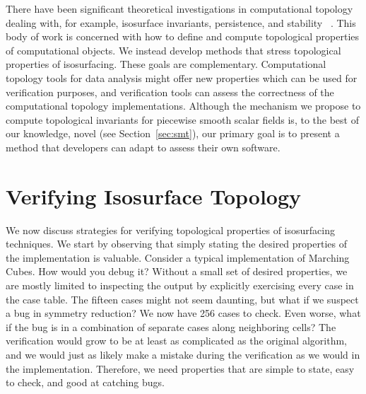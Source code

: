 There have been significant theoretical investigations in computational
topology dealing with, for example, isosurface invariants, persistence, and stability~
\cite{Cohen-Steiner07, edelsbrunner10}.
%
This body of work is concerned with how to
define and compute topological properties of computational objects. 
%
We instead develop methods that stress topological properties of isosurfacing.
%
These goals are complementary.
%
Computational topology 
tools for data analysis might offer new properties which can be used
for verification purposes, and verification tools can
assess the correctness of the computational topology implementations.
%
Although the mechanism we propose to compute topological invariants
for piecewise smooth scalar fields is, to the best of our knowledge,
novel (see Section~\ref{sec:smt}), our primary goal is to present a
method that developers can adapt to assess their own software.


\section{Verifying Isosurface Topology}
\label{sec:problem}

We now discuss strategies for verifying topological
properties of isosurfacing techniques. 
%
We start by observing that simply stating the desired properties of
the implementation is valuable.
%
Consider a typical implementation of Marching Cubes.
%
How would you debug it?
%
Without a small set of desired properties, we are mostly limited to
inspecting the output by explicitly exercising every case in the case
table. The fifteen cases might not seem daunting, but what if we
suspect a bug in symmetry reduction? We now have 256 cases
to check. Even worse, what if the bug is in a combination of separate
cases along neighboring cells?
%
The verification would grow to be at least as complicated as the
original algorithm, and we would just as likely make a mistake during
the verification as we would in the implementation.
%
Therefore, we need properties that are simple to state, easy to check,
and good at catching bugs.

